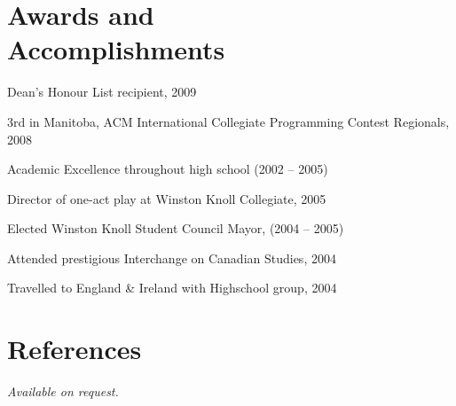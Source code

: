 \documentclass[margin,line,letterpaper]{resume}
\begin{document}
\begin{resume}
  \section{\mysidestyle Awards and\\Accomplishments}

  \begin{list2}
    \item Dean's Honour List recipient, 2009
    \item 3rd in Manitoba, ACM International Collegiate Programming Contest Regionals, 2008
    \item Academic Excellence throughout high school (2002 -- 2005)
    \item Director of one-act play at Winston Knoll Collegiate, 2005
    \item Elected Winston Knoll Student Council Mayor, (2004 -- 2005)
    \item Attended prestigious Interchange on Canadian Studies, 2004
    \item Travelled to England \& Ireland with Highschool group, 2004
  \end{list2}

  \section{\mysidestyle References}

  {\sl Available on request.}

\end{resume}
\end{document}
